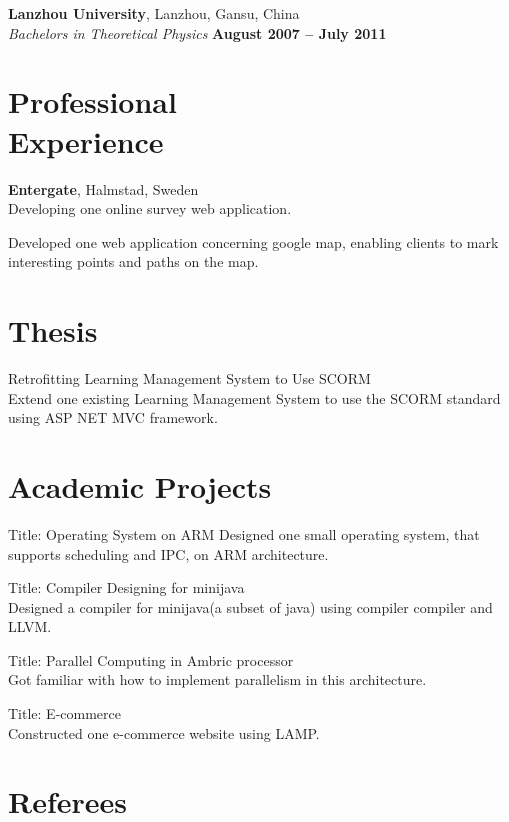 \documentclass[margin,line]{resume}
\begin{document}
\begin{resume}
		\textbf{Lanzhou University}, Lanzhou, Gansu, China \vspace{2mm}\\\vspace{1mm}%
		\textsl{Bachelors in Theoretical Physics} \hfill \textbf{ August 2007 -- July 2011}\vspace{-3mm}\\\vspace{-1mm}%

	\section{\mysidestyle Professional\\Experience}
		\textbf{Entergate}, Halmstad, Sweden \vspace{2mm}\\\vspace{1mm}%
		Developing one online survey web application.

		Developed one web application concerning google map, enabling clients to mark interesting points and paths on the map.

	\section{\mysidestyle Thesis}
		Retrofitting Learning Management System to Use SCORM \\
		Extend one existing Learning Management System to use the SCORM standard using ASP NET MVC framework.

	\section{\mysidestyle Academic Projects}
		Title: Operating System on ARM
		Designed one small operating system, that supports scheduling and IPC, on ARM architecture.

		Title: Compiler Designing for minijava\\
		Designed a compiler for minijava(a subset of java) using compiler compiler and LLVM.

		Title: Parallel Computing in Ambric processor\\
		Got familiar with how to implement parallelism in this architecture.

		Title: E-commerce\\
		Constructed one e-commerce website using LAMP.

	\section{\mysidestyle Referees} 


\end{resume}
\end{document}
